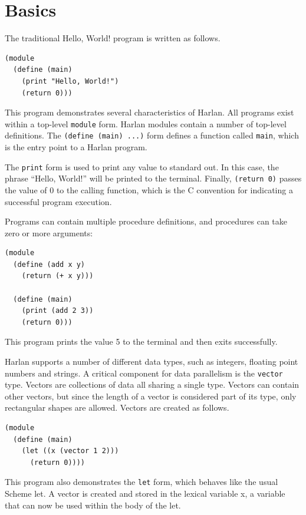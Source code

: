 \documentclass[oneside]{report}
\begin{document}
\section{Basics}

The traditional Hello, World! program is written as follows.

\begin{lstlisting}
(module
  (define (main)
    (print "Hello, World!")
    (return 0)))
\end{lstlisting}

This program demonstrates several characteristics of Harlan. All
programs exist within a top-level \lstinline{module} form. Harlan
modules contain a number of top-level definitions. The
\lstinline{(define (main) ...)} form defines a function called
\lstinline{main}, which is the entry point to a Harlan program.

The \lstinline{print} form is used to print any value to standard
out. In this case, the phrase ``Hello, World!'' will be printed to the
terminal. Finally, \lstinline{(return 0)} passes the value of 0 to the
calling function, which is the C convention for indicating a
successful program execution.

Programs can contain multiple procedure definitions, and procedures
can take zero or more arguments:

\begin{lstlisting}
(module
  (define (add x y)
    (return (+ x y)))

  (define (main)
    (print (add 2 3))
    (return 0)))
\end{lstlisting}

This program prints the value 5 to the terminal and then exits
successfully.

Harlan supports a number of different data types, such as integers,
floating point numbers and strings. A critical component for data
parallelism is the \lstinline{vector} type. Vectors are collections of
data all sharing a single type. Vectors can contain other vectors, but
since the length of a vector is considered part of its type, only
rectangular shapes are allowed. Vectors are created as follows.

\begin{lstlisting}
(module
  (define (main)
    (let ((x (vector 1 2)))
      (return 0))))
\end{lstlisting}

This program also demonstrates the \lstinline{let} form, which behaves
like the usual Scheme let. A vector is created and stored in the lexical variable x, a variable that can now be used within the body of the let.
\end{document}
